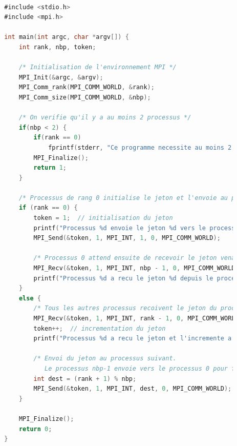 \documentclass[a4paper,13pt]{book}
\begin{document}
	\begin{lstlisting}[language=C, caption=Code source de \texttt{jeton.c}]

        #include <stdio.h>
        #include <mpi.h>
        
        int main(int argc, char *argv[]) {
            int rank, nbp, token;
        
            /* Initialisation de l'environnement MPI */
            MPI_Init(&argc, &argv);
            MPI_Comm_rank(MPI_COMM_WORLD, &rank);
            MPI_Comm_size(MPI_COMM_WORLD, &nbp);
        
            /* On verifie qu'il y a au moins 2 processus */
            if(nbp < 2) {
                if(rank == 0)
                    fprintf(stderr, "Ce programme necessite au moins 2 processus.\n");
                MPI_Finalize();
                return 1;
            }
        
            /* Processus de rang 0 initialise le jeton et l'envoie au processus de rang 1 */
            if (rank == 0) {
                token = 1;  // initialisation du jeton
                printf("Processus %d envoie le jeton %d vers le processus 1\n", rank, token);
                MPI_Send(&token, 1, MPI_INT, 1, 0, MPI_COMM_WORLD);
                
                /* Processus 0 attend ensuite de recevoir le jeton venant du dernier processus */
                MPI_Recv(&token, 1, MPI_INT, nbp - 1, 0, MPI_COMM_WORLD, MPI_STATUS_IGNORE);
                printf("Processus %d a recu le jeton %d depuis le processus %d\n", rank, token, nbp - 1);
            }
            else {
                /* Tous les autres processus recoivent le jeton du processus precedent */
                MPI_Recv(&token, 1, MPI_INT, rank - 1, 0, MPI_COMM_WORLD, MPI_STATUS_IGNORE);
                token++;  // incrementation du jeton
                printf("Processus %d a recu le jeton et l'incremente a %d\n", rank, token);
        
                /* Envoi du jeton au processus suivant.
                   Le processus nbp-1 envoie vers le processus 0 pour fermer l'anneau. */
                int dest = (rank + 1) % nbp;
                MPI_Send(&token, 1, MPI_INT, dest, 0, MPI_COMM_WORLD);
            }
        
            MPI_Finalize();
            return 0;
        }
        
\end{lstlisting}
\end{document}
